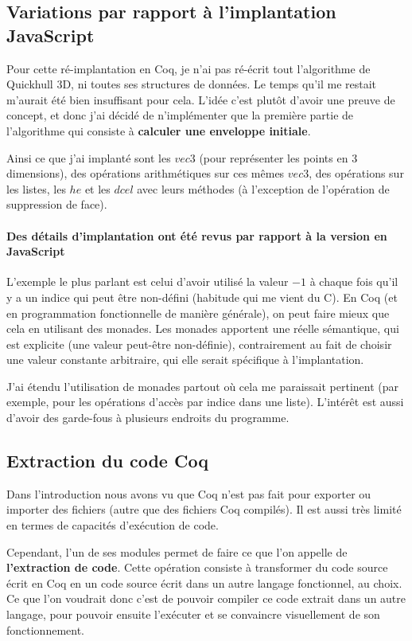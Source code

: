 \documentclass[]{article}
\begin{document}
\subsection{Variations par rapport à l'implantation JavaScript}
Pour cette ré-implantation en Coq, je n'ai pas ré-écrit tout l'algorithme de Quickhull 3D, ni toutes ses structures de données. Le temps qu'il me restait m'aurait été bien insuffisant pour cela. L'idée c'est plutôt d'avoir une preuve de concept, et donc j'ai décidé de n'implémenter que la première partie de l'algorithme qui consiste à \textbf{calculer une enveloppe initiale}.

Ainsi ce que j'ai implanté sont les $vec3$ (pour représenter les points en 3 dimensions), des opérations arithmétiques sur ces mêmes $vec3$, des opérations sur les listes, les $he$ et les $dcel$ avec leurs méthodes (à l'exception de l'opération de suppression de face).

\paragraph{Des détails d'implantation ont été revus par rapport à la version en JavaScript}
L'exemple le plus parlant est celui d'avoir utilisé la valeur $-1$ à chaque fois qu'il y a un indice qui peut être non-défini (habitude qui me vient du C). En Coq (et en programmation fonctionnelle de manière générale), on peut faire mieux que cela en utilisant des monades. Les monades apportent une réelle sémantique, qui est explicite (une valeur peut-être non-définie), contrairement au fait de choisir une valeur constante arbitraire, qui elle serait spécifique à l'implantation.

J'ai étendu l'utilisation de monades partout où cela me paraissait pertinent (par exemple, pour les opérations d'accès par indice dans une liste). L'intérêt est aussi d'avoir des garde-fous à plusieurs endroits du programme.

\subsection{Extraction du code Coq}
Dans l'introduction nous avons vu que Coq n'est pas fait pour exporter ou importer des fichiers (autre que des fichiers Coq compilés). Il est aussi très limité en termes de capacités d'exécution de code.

Cependant, l'un de ses modules permet de faire ce que l'on appelle de \textbf{l'extraction de code}. Cette opération consiste à transformer du code source écrit en Coq en un code source écrit dans un autre langage fonctionnel, au choix. Ce que l'on voudrait donc c'est de pouvoir compiler ce code extrait dans un autre langage, pour pouvoir ensuite l'exécuter et se convaincre visuellement de son fonctionnement.
\end{document}
